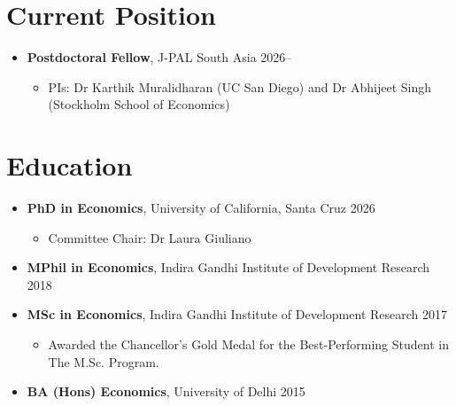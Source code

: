 \documentclass[letter,11pt]{article}
\newcommand{\dateright}[1]{\hfill{\small #1}}
\begin{document}
\thispagestyle{firstpage} %

\section{Current Position}
\begin{itemize}
    \item[] \textbf{Postdoctoral Fellow}, J-PAL South Asia \dateright{2026--}
    \begin{itemize}
        \item[] \small{PIs: Dr Karthik Muralidharan (UC San Diego) and Dr Abhijeet Singh (Stockholm School of Economics)}
    \end{itemize}
\end{itemize}

\section{Education}
\begin{itemize}
    \item[] \textbf{PhD in Economics}, University of California, Santa Cruz \dateright{2026}
        \begin{itemize}
            \item[] Committee Chair: Dr Laura Giuliano
            \end{itemize}
    \item[] \textbf{MPhil in Economics}, Indira Gandhi Institute of Development Research \dateright{2018}
    \item[] \textbf{MSc in Economics}, Indira Gandhi Institute of Development Research \dateright{2017}
    \begin{itemize}
            \item[] Awarded the Chancellor's Gold Medal for the Best-Performing Student in The M.Sc. Program.
        \end{itemize}
    \item \textbf{BA (Hons) Economics}, University of Delhi \dateright{2015}
\end{itemize}
\end{document}
